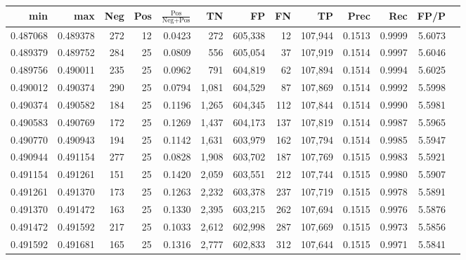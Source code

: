 \begin{tabular}{rrrrrrrrrrrrr}
\toprule
     min &      max & Neg & Pos & $\frac{\text{Pos}}{\text{Neg}+\text{Pos}}$ &      TN &      FP &      FN &      TP &   Prec &    Rec &   FP/P \\
\midrule
0.487068 & 0.489378 & 272 &  12 &                                     0.0423 &     272 & 605,338 &      12 & 107,944 & 0.1513 & 0.9999 & 5.6073 \\
0.489379 & 0.489752 & 284 &  25 &                                     0.0809 &     556 & 605,054 &      37 & 107,919 & 0.1514 & 0.9997 & 5.6046 \\
0.489756 & 0.490011 & 235 &  25 &                                     0.0962 &     791 & 604,819 &      62 & 107,894 & 0.1514 & 0.9994 & 5.6025 \\
0.490012 & 0.490374 & 290 &  25 &                                     0.0794 &   1,081 & 604,529 &      87 & 107,869 & 0.1514 & 0.9992 & 5.5998 \\
0.490374 & 0.490582 & 184 &  25 &                                     0.1196 &   1,265 & 604,345 &     112 & 107,844 & 0.1514 & 0.9990 & 5.5981 \\
0.490583 & 0.490769 & 172 &  25 &                                     0.1269 &   1,437 & 604,173 &     137 & 107,819 & 0.1514 & 0.9987 & 5.5965 \\
0.490770 & 0.490943 & 194 &  25 &                                     0.1142 &   1,631 & 603,979 &     162 & 107,794 & 0.1514 & 0.9985 & 5.5947 \\
0.490944 & 0.491154 & 277 &  25 &                                     0.0828 &   1,908 & 603,702 &     187 & 107,769 & 0.1515 & 0.9983 & 5.5921 \\
0.491154 & 0.491261 & 151 &  25 &                                     0.1420 &   2,059 & 603,551 &     212 & 107,744 & 0.1515 & 0.9980 & 5.5907 \\
0.491261 & 0.491370 & 173 &  25 &                                     0.1263 &   2,232 & 603,378 &     237 & 107,719 & 0.1515 & 0.9978 & 5.5891 \\
0.491370 & 0.491472 & 163 &  25 &                                     0.1330 &   2,395 & 603,215 &     262 & 107,694 & 0.1515 & 0.9976 & 5.5876 \\
0.491472 & 0.491592 & 217 &  25 &                                     0.1033 &   2,612 & 602,998 &     287 & 107,669 & 0.1515 & 0.9973 & 5.5856 \\
0.491592 & 0.491681 & 165 &  25 &                                     0.1316 &   2,777 & 602,833 &     312 & 107,644 & 0.1515 & 0.9971 & 5.5841 \\

\end{tabular}
